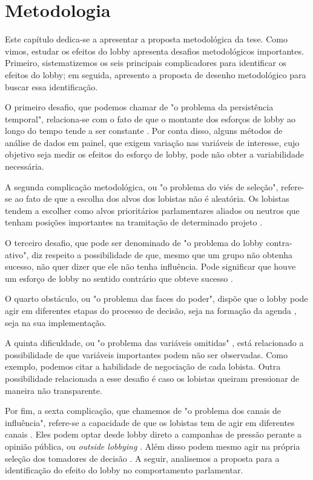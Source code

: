 \chapter{Metodologia}
\label{chapter:metodologia}
Este capítulo dedica-se a apresentar a proposta metodológica da tese. Como vimos, estudar os efeitos do lobby apresenta desafios metodológicos importantes. Primeiro, sistematizemos os seis principais complicadores para identificar os efeitos do lobby; em seguida, apresento a proposta de desenho metodológico para buscar essa identificação.

O primeiro desafio, que podemos chamar de "o problema da persistência temporal", relaciona-se com o fato de que o montante dos esforços de lobby ao longo do tempo tende a ser constante \cite{de_figueiredo_advancing_2014}. Por conta disso, alguns métodos de análise de dados em painel, que exigem variação nas variáveis de interesse, cujo objetivo seja medir os efeitos do esforço de lobby, pode não obter a variabilidade necessária.

A segunda complicação metodológica, ou "o problema do viés de seleção", refere-se ao fato de que a escolha dos alvos dos lobistas não é aleatória. Os lobistas tendem a escolher como alvos prioritários parlamentares aliados \cite{kollman1998outside, caldeira2000lobbying, hojnacki2001pac} ou neutros \cite{holyoke2003choosing, kelleher2009political, bertrand2014whom, gawande2012lobbying} que tenham posições importantes na tramitação de determinado projeto \cite{marshall2010lobby}.

O terceiro desafio, que pode ser denominado de "o problema do lobby contra-ativo", diz respeito a possibilidade de que, mesmo que um grupo não obtenha sucesso, não quer dizer que ele não tenha influência. Pode significar que houve um esforço de lobby no sentido contrário que obteve sucesso \cite{austen1996theory}.

O quarto obstáculo, ou "o problema das faces do poder", dispõe que o lobby pode agir em diferentes etapas do processo de decisão, seja na formação da agenda \cite{bachrach1962two}, seja na sua implementação.

A quinta dificuldade, ou "o problema das variáveis omitidas" \cite{de_figueiredo_advancing_2014}, está relacionado a possibilidade de que variáveis importantes podem não ser observadas. Como exemplo, podemos citar a habilidade de negociação de cada lobista. Outra possibilidade relacionada a esse desafio é caso os lobistas queiram pressionar de maneira não transparente.

Por fim, a sexta complicação, que chamemos de "o problema dos canais de influência", refere-se a capacidade de que os lobistas tem de agir em diferentes canais \cite{dur_measuring_2008}. Eles podem optar desde lobby direto a campanhas de pressão perante a opinião pública, ou \textit{outside lobbying} \cite{kollman1998outside}. Além disso podem mesmo agir na própria seleção dos tomadores de decisão \cite{fordham2003selection}. A seguir, analisemos a proposta para a identificação do efeito do lobby no comportamento parlamentar.


